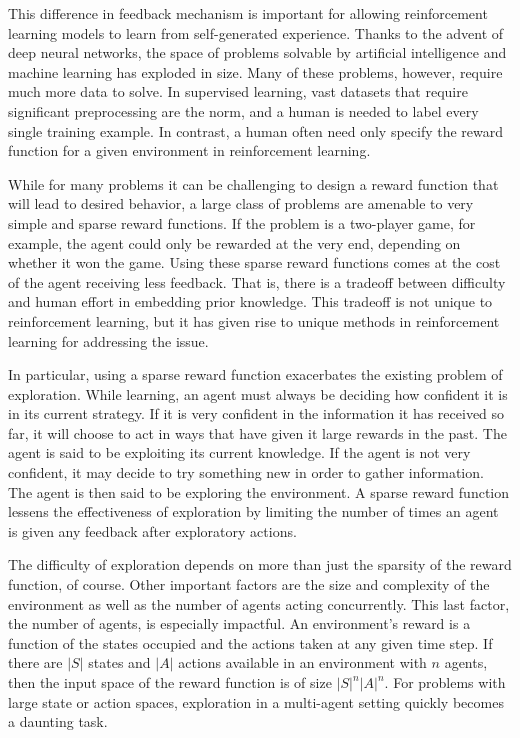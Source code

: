 \documentclass[12pt,journal,compsoc]{IEEEtran}
\begin{document}
	This difference in feedback mechanism is important for allowing reinforcement learning models to learn from self-generated experience. Thanks to the advent of deep neural networks, the space of problems solvable by artificial intelligence and machine learning has exploded in size. Many of these problems, however, require much more data to solve. In supervised learning, vast datasets that require significant preprocessing are the norm, and a human is needed to label every single training example. In contrast, a human often need only specify the reward function for a given environment in reinforcement learning. 
	
	While for many problems it can be challenging to design a reward function that will lead to desired behavior, a large class of problems are amenable to very simple and sparse reward functions. If the problem is a two-player game, for example, the agent could only be rewarded at the very end, depending on whether it won the game. Using these sparse reward functions comes at the cost of the agent receiving less feedback. That is, there is a tradeoff between difficulty and human effort in embedding prior knowledge. This tradeoff is not unique to reinforcement learning, but it has given rise to unique methods in reinforcement learning for addressing the issue.
	
	In particular, using a sparse reward function exacerbates the existing problem of exploration. While learning, an agent must always be deciding how confident it is in its current strategy. If it is very confident in the information it has received so far, it will choose to act in ways that have given it large rewards in the past. The agent is said to be exploiting its current knowledge. If the agent is not very confident, it may decide to try something new in order to gather information. The agent is then said to be exploring the environment. A sparse reward function lessens the effectiveness of exploration by limiting the number of times an agent is given any feedback after exploratory actions.
	
	The difficulty of exploration depends on more than just the sparsity of the reward function, of course. Other important factors are the size and complexity of the environment as well as the number of agents acting concurrently. This last factor, the number of agents, is especially impactful. An environment's reward is a function of the states occupied and the actions taken at any given time step. If there are $\lvert S \rvert$ states and $\lvert A \rvert$ actions available in an environment with $n$ agents, then the input space of the reward function is of size $\lvert S \rvert^n \lvert A \rvert^n$. For problems with large state or action spaces, exploration in a multi-agent setting quickly becomes a daunting task.
	
\end{document}
